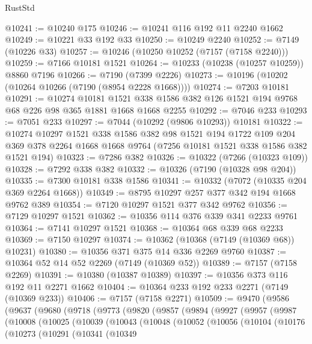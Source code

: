 \begin{lexlean}{RustStd}
\begin{coremodule}
@10241 := @10240 @175
@10246 := @10241 @116 @192 @11 @2240 @1662
@10249 := @10221 @33 @192 @33
@10250 := @10249 @2240
@10252 := @7149 (@10226 @33)
@10257 := @10246 (@10250 @10252 (@7157 (@7158 @2240)))
@10259 := @7166 @10181 @1521
@10264 := @10233 (@10238 (@10257 @10259)) @8860 @7196
@10266 := @7190 (@7399 @2226)
@10273 := @10196 (@10202 (@10264 @10266 (@7190 (@8954 @2228 @1668))))
@10274 := @7203 @10181
@10291 := @10274
    @10181
    @1521
    @338
    @1586
    @382
    @126
    @1521
    @194
    @9768
    @68
    @226
    @98
    @365
    @1881
    @1668
    @1668
    @2255
@10292 := @7046 @233
@10293 := @7051 @233
@10297 := @7044 (@10292 (@9806 @10293)) @10181
@10322 := @10274
    @10297
    @1521
    @338
    @1586
    @382
    @98
    @1521
    @194
    @1722
    @109
    @204
    @369
    @378
    @2264
    @1668
    @1668
    @9764
    (@7256 @10181 @1521 @338 @1586 @382 @1521 @194)
@10323 := @7286 @382
@10326 := @10322 (@7266 (@10323 @109))
@10328 := @7292 @338 @382
@10332 := @10326 (@7190 (@10328 @98 @204))
@10335 := @7300 @10181 @338 @1586
@10341 := @10332 (@7072 (@10335 @204 @369 @2264 @1668))
@10349 := @8795 @10297 @257 @377 @342 @194 @1668 @9762 @389
@10354 := @7120 @10297 @1521 @377 @342 @9762
@10356 := @7129 @10297 @1521
@10362 := @10356 @114 @376 @339 @341 @2233 @9761
@10364 := @7141 @10297 @1521
@10368 := @10364 @68 @339 @68 @2233
@10369 := @7150 @10297
@10374 := @10362 (@10368 (@7149 (@10369 @68)) @10231)
@10380 := @10356 @371 @375 @14 @336 @2269 @9760
@10387 := @10364 @52 @14 @52 @2269 (@7149 (@10369 @52))
@10389 := @7157 (@7158 @2269)
@10391 := @10380 (@10387 @10389)
@10397 := @10356 @373 @116 @192 @11 @2271 @1662
@10404 := @10364 @233 @192 @233 @2271 (@7149 (@10369 @233))
@10406 := @7157 (@7158 @2271)
@10509 := @9470
    (@9586
      (@9637
        (@9680
          (@9718
            (@9773
              (@9820
                (@9857
                  (@9894
                    (@9927
                      (@9957
                        (@9987
                          (@10008
                            (@10025
                              (@10039
                                (@10043
                                  (@10048
                                    (@10052
                                      (@10056
                                        (@10104
                                          (@10176
                                            (@10273
                                              (@10291
                                                (@10341
                                                  (@10349

\end{coremodule}
\end{lexlean}
